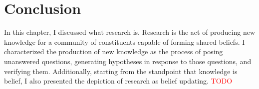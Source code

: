 


\section{Conclusion}
In this chapter, I discussed what research is. Research is the act of producing new knowledge for a community of constituents capable of forming shared beliefs. I characterized the production of new knowledge as the process of posing unanswered questions, generating hypotheses in response to those questions, and verifying them. Additionally, starting from the standpoint that knowledge is belief, I also presented the depiction of research as belief updating.
\textcolor{red}{TODO}